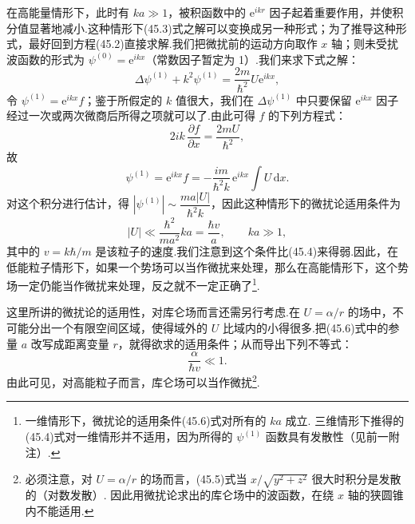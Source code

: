 在高能量情形下，此时有 $ka\gg1$，被积函数中的 $\mathrm{e}^{ikr}$ 因子起着重要作用，并使积分值显著地减小.这种情形下(45.3)式之解可以变换成另一种形式；为了推导这种形式，最好回到方程(45.2)直接求解.我们把微扰前的运动方向取作 $x$ 轴；则未受扰波函数的形式为 $\psi^{(0)}=\mathrm{e}^{ikx}$（常数因子暂定为 1）.我们来求下式之解：
\begin{equation*}
  \Delta\psi^{(1)}+k^2\psi^{(1)}=\frac{2m}{\hbar^2}U\mathrm{e}^{ikx},
\end{equation*}
令 $\psi^{(1)}=\mathrm{e}^{ikx}f$；鉴于所假定的 $k$ 值很大，我们在 $\Delta\psi^{(1)}$ 中只要保留 $\mathrm{e}^{ikx}$ 因子经过一次或两次微商后所得之项就可以了.由此可得 $f$ 的下列方程式：
\begin{equation*}
  2ik\,\frac{\partial f}{\partial x}=\frac{2mU}{\hbar^2},
\end{equation*}
故
\begin{equation}
  \psi^{(1)}=\mathrm{e}^{ikx}f=-\frac{im}{\hbar^2k}\,\mathrm{e}^{ikx}\int U\,\mathrm{d}x.
\end{equation}
对这个积分进行估计，得 $|\psi^{(1)}|\sim\dfrac{ma|U|}{\hbar^2k}$，因此这种情形下的微扰论适用条件为
\begin{equation}
  |U|\ll\frac{\hbar^2}{ma^2}ka=\frac{\hbar v}{a},\qquad ka\gg1,
\end{equation}
其中的 $v=k\hbar/m$ 是该粒子的速度.我们注意到这个条件比(45.4)来得弱.因此，在低能粒子情形下，如果一个势场可以当作微扰来处理，那么在高能情形下，这个势场一定仍能当作微扰来处理，反之就不一定正确了\footnote{一维情形下，微扰论的适用条件(45.6)式对所有的 $ka$ 成立. 三维情形下推得的(45.4)式对一维情形并不适用，因为所得的 $\psi^{(1)}$ 函数具有发散性（见前一附注）.}.

这里所讲的微扰论的适用性，对库仑场而言还需另行考虑.在 $U=\alpha/r$ 的场中，不可能分出一个有限空间区域，使得域外的 $U$ 比域内的小得很多.把(45.6)式中的参量 $a$ 改写成距离变量 $r$，就得欲求的适用条件；从而导出下列不等式：
\begin{equation}
  \frac{\alpha}{\hbar v}\ll1.
\end{equation}
由此可见，对高能粒子而言，库仑场可以当作微扰\footnote{必须注意，对 $U=\alpha/r$ 的场而言，(45.5)式当 $x/\sqrt{y^2+z^2}$ 很大时积分是发散的（对数发散）. 因此用微扰论求出的库仑场中的波函数，在绕 $x$ 轴的狭圆锥内不能适用.}.

